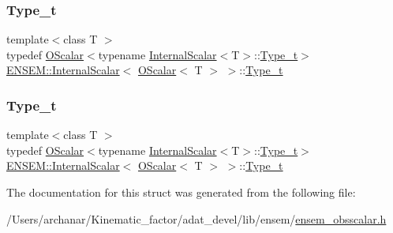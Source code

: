 \subsubsection{\texorpdfstring{Type\_t}{Type\_t}\hspace{0.1cm}{\footnotesize\ttfamily [1/2]}}
{\footnotesize\ttfamily template$<$class T $>$ \\
typedef \mbox{\hyperlink{classENSEM_1_1OScalar}{O\+Scalar}}$<$typename \mbox{\hyperlink{structENSEM_1_1InternalScalar}{Internal\+Scalar}}$<$T$>$\+::\mbox{\hyperlink{structENSEM_1_1InternalScalar_3_01OScalar_3_01T_01_4_01_4_a9d07cdf2267bf23524d55f3626782f7c}{Type\+\_\+t}}$>$ \mbox{\hyperlink{structENSEM_1_1InternalScalar}{E\+N\+S\+E\+M\+::\+Internal\+Scalar}}$<$ \mbox{\hyperlink{classENSEM_1_1OScalar}{O\+Scalar}}$<$ T $>$ $>$\+::\mbox{\hyperlink{structENSEM_1_1InternalScalar_3_01OScalar_3_01T_01_4_01_4_a9d07cdf2267bf23524d55f3626782f7c}{Type\+\_\+t}}}

\mbox{\label{structENSEM_1_1InternalScalar_3_01OScalar_3_01T_01_4_01_4_a9d07cdf2267bf23524d55f3626782f7c}} 
\subsubsection{\texorpdfstring{Type\_t}{Type\_t}\hspace{0.1cm}{\footnotesize\ttfamily [2/2]}}
{\footnotesize\ttfamily template$<$class T $>$ \\
typedef \mbox{\hyperlink{classENSEM_1_1OScalar}{O\+Scalar}}$<$typename \mbox{\hyperlink{structENSEM_1_1InternalScalar}{Internal\+Scalar}}$<$T$>$\+::\mbox{\hyperlink{structENSEM_1_1InternalScalar_3_01OScalar_3_01T_01_4_01_4_a9d07cdf2267bf23524d55f3626782f7c}{Type\+\_\+t}}$>$ \mbox{\hyperlink{structENSEM_1_1InternalScalar}{E\+N\+S\+E\+M\+::\+Internal\+Scalar}}$<$ \mbox{\hyperlink{classENSEM_1_1OScalar}{O\+Scalar}}$<$ T $>$ $>$\+::\mbox{\hyperlink{structENSEM_1_1InternalScalar_3_01OScalar_3_01T_01_4_01_4_a9d07cdf2267bf23524d55f3626782f7c}{Type\+\_\+t}}}



The documentation for this struct was generated from the following file\+:\begin{DoxyCompactItemize}
\item 
/\+Users/archanar/\+Kinematic\+\_\+factor/adat\+\_\+devel/lib/ensem/\mbox{\hyperlink{lib_2ensem_2ensem__obsscalar_8h}{ensem\+\_\+obsscalar.\+h}}\end{DoxyCompactItemize}
